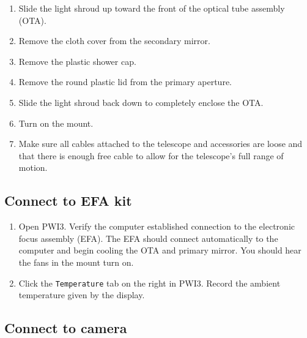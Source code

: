 \documentclass{article}
\begin{document}
	\begin{enumerate}
		
		\item Slide the light shroud up toward the front of the optical tube assembly (OTA).
		
		\item Remove the cloth cover from the secondary mirror.
		
		\item Remove the plastic shower cap.
		
		\item Remove the round plastic lid from the primary aperture.
		
		\item Slide the light shroud back down to completely enclose the OTA.
		
		\item Turn on the mount.
		
		\item Make sure all cables attached to the telescope and accessories are loose and that there is enough free cable to allow for the telescope's full range of motion.
		
	\end{enumerate}
	
	\subsection{Connect to EFA kit}
	\label{sec:connect-to-efa-kit}
	
	\begin{enumerate}
		
		\item Open PWI3. Verify the computer established connection to the electronic focus assembly (EFA). The EFA should connect automatically to the computer and begin cooling the OTA and primary mirror. You should hear the fans in the mount turn on.
		
		\item Click the \texttt{Temperature} tab on the right in PWI3. Record the ambient temperature given by the display.
		
	\end{enumerate}
	
	\subsection{Connect to camera}
	\label{sec:connect-to-camera}
	
\end{document}
